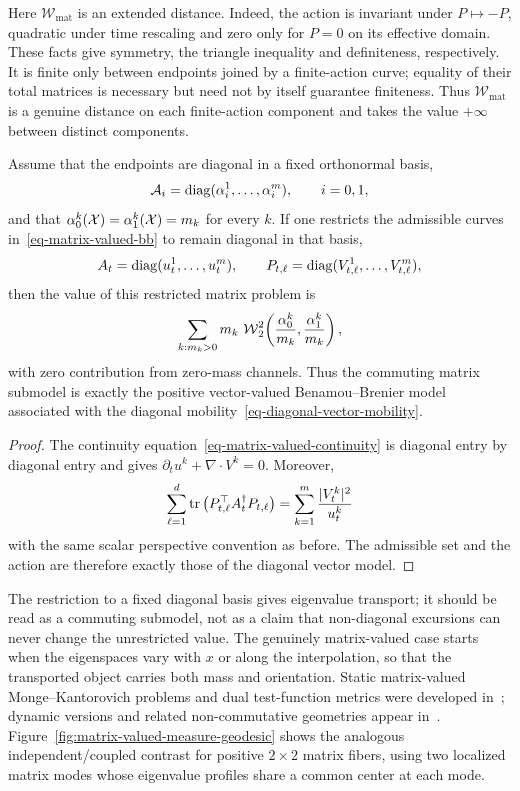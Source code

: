 Here $\mathcal W_{\mathrm{mat}}$ is an extended distance. Indeed, the action is invariant under $P\mapsto-P$, quadratic under time rescaling and zero only for $P=0$ on its effective domain. These facts give symmetry, the triangle inequality and definiteness, respectively. It is finite only between endpoints joined by a finite-action curve; equality of their total matrices is necessary but need not by itself guarantee finiteness. Thus $\mathcal W_{\mathrm{mat}}$ is a genuine distance on each finite-action component and takes the value $+\infty$ between distinct components.

\begin{prop}\label{prop-matrix-diagonal-reduction}
Assume that the endpoints are diagonal in a fixed orthonormal basis,
\[
	\mathcal A_i=\operatorname{diag}(\alpha_i^1,\ldots,\alpha_i^m),
	\qquad i=0,1,
\]
and that $\alpha_0^k(\mathcal{X})=\alpha_1^k(\mathcal{X})=m_k$ for every $k$. If one restricts the admissible curves in~\eqref{eq-matrix-valued-bb} to remain diagonal in that basis,
\[
	A_t=\operatorname{diag}(u_t^1,\ldots,u_t^m),
	\qquad
	P_{t,\ell}=\operatorname{diag}(V_{t,\ell}^1,\ldots,V_{t,\ell}^m),
\]
then the value of this restricted matrix problem is
\[
	\sum_{k:m_k>0} m_k\,\operatorname{\mathcal{W}}_2^2\!\left(\frac{\alpha_0^k}{m_k},\frac{\alpha_1^k}{m_k}\right),
\]
with zero contribution from zero-mass channels. Thus the commuting matrix submodel is exactly the positive vector-valued Benamou--Brenier model associated with the diagonal mobility~\eqref{eq-diagonal-vector-mobility}.
\end{prop}
\begin{proof}
The continuity equation~\eqref{eq-matrix-valued-continuity} is diagonal entry by diagonal entry and gives $\partial_t u^k+\nabla\cdot V^k=0$. Moreover,
\[
	\sum_{\ell=1}^d \operatorname{tr}\big(P_{t,\ell}^{\top}A_t^\dagger P_{t,\ell}\big)
	=
	\sum_{k=1}^m \frac{|V_t^k|^2}{u_t^k}
\]
with the same scalar perspective convention as before. The admissible set and the action are therefore exactly those of the diagonal vector model.
\end{proof}

The restriction to a fixed diagonal basis gives eigenvalue transport; it should be read as a commuting submodel, not as a claim that non-diagonal excursions can never change the unrestricted value. The genuinely matrix-valued case starts when the eigenspaces vary with $x$ or along the interpolation, so that the transported object carries both mass and orientation. Static matrix-valued Monge--Kantorovich problems and dual test-function metrics were developed in~\cite{Ning2014metrics,JiangSpectral,ning2015matrix}; dynamic versions and related non-commutative geometries appear in~\cite{Chen2016,ChenGangbo17,Carlen2014,2016-peyre-qot}. Figure~\ref{fig:matrix-valued-measure-geodesic} shows the analogous independent/coupled contrast for positive $2\times2$ matrix fibers, using two localized matrix modes whose eigenvalue profiles share a common center at each mode.

